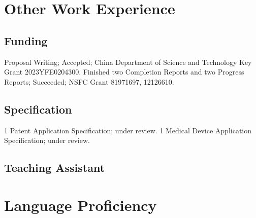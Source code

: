 \documentclass[11pt,a4paper, final]{moderncv}
\newcommand{\spacesection}{\vspace{0.4cm}}
\newcommand{\spacesubsection}{\vspace{0.2cm}}
\begin{document}
\section{\textbf{Other Work Experience}}
	\subsection{\textbf{Funding}}
		{Proposal Writing; Accepted; China Department of Science and Technology Key Grant 2023YFE0204300.}
		{Finished two Completion Reports and two Progress Reports; Succeeded; NSFC Grant 81971697, 12126610.}
	\subsection{\textbf{Specification}}
		{1 Patent Application Specification; under review.}
		{1 Medical Device Application Specification; under review.}
	\subsection{\textbf{Teaching Assistant}}
\section{\textbf{Language Proficiency}}
\end{document}
